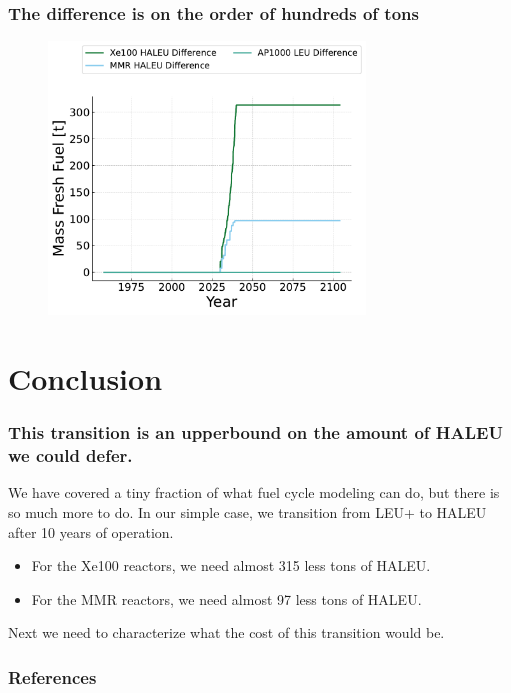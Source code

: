 \documentclass[9pt]{beamer}
\begin{document}
  \begin{frame}
    \frametitle{The difference is on the order of hundreds of tons}
    \begin{figure}
        \centering
        \includegraphics[width=0.75\textwidth]{../images/fresh_fuel_difference.pdf}
    \end{figure}
  \end{frame}


  \section{Conclusion}
  \begin{frame}
      \frametitle{This transition is an upperbound on the amount of HALEU we could defer.}
      We have covered a tiny fraction of what fuel cycle modeling can do, but there is so much more to do. In our simple case, we transition from LEU+ to HALEU after 10 years of operation.
      \begin{itemize}
          \item For the Xe100 reactors, we need almost 315 less tons of HALEU.
          \item For the MMR reactors, we need almost 97 less tons of HALEU.
      \end{itemize}
      Next we need to characterize what the cost of this transition would be.
  \end{frame}






\begin{frame}[allowframebreaks]
  \frametitle{References}
  
  {\footnotesize  }

\end{frame}


\end{document}

